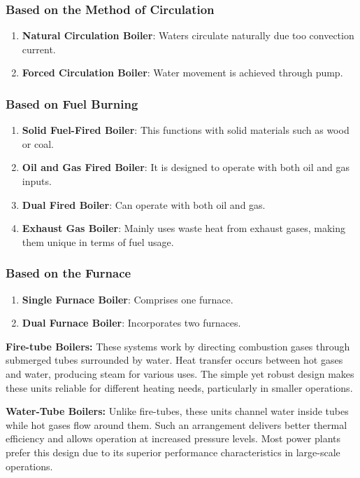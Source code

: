 \subsubsection{Based on the Method of Circulation}
\begin{enumerate}
    \item \textbf{Natural Circulation Boiler}: Waters circulate naturally due too convection current.
    \item \textbf{Forced Circulation Boiler}: Water movement is achieved through pump.
\end{enumerate}

\subsubsection{Based on Fuel Burning}
\begin{enumerate}
    \item \textbf{Solid Fuel-Fired Boiler}: This functions with solid materials such as wood or coal.
    \item \textbf{Oil and Gas Fired Boiler}: It is designed to operate with both oil and gas inputs.
    \item \textbf{Dual Fired Boiler}: Can operate with both oil and gas.
    \item \textbf{Exhaust Gas Boiler}: Mainly uses waste heat from exhaust gases, making them unique in terms of fuel usage.
\end{enumerate}

\subsubsection{Based on the Furnace}
\begin{enumerate}
    \item \textbf{Single Furnace Boiler}: Comprises one furnace.
    \item \textbf{Dual Furnace Boiler}: Incorporates two furnaces.
\end{enumerate}


\textbf{Fire-tube Boilers:}
These systems work by directing combustion gases through submerged tubes surrounded by water. Heat transfer occurs between hot gases and water, producing steam for various uses. The simple yet robust design makes these units reliable for different heating needs, particularly in smaller operations.

\textbf{Water-Tube Boilers:}
Unlike fire-tubes, these units channel water inside tubes while hot gases flow around them. Such an arrangement delivers better thermal efficiency and allows operation at increased pressure levels. Most power plants prefer this design due to its superior performance characteristics in large-scale operations.

